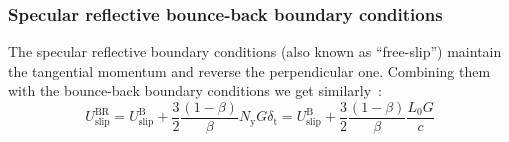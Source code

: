 \subsubsection{Specular reflective bounce-back boundary conditions}
The specular reflective boundary conditions (also known as ``free-slip'') maintain the
tangential momentum and reverse the perpendicular one. Combining them with the bounce-back boundary
conditions we get similarly~\cite{Verhaeghe2009}:
\begin{equation}
 U_\mathrm{slip}^\mathrm{BR} = U_\mathrm{slip}^\mathrm{B} + \frac{3}{2} \frac{(1-\beta)}{\beta} N_\mathrm{y} G \delta_\mathrm{t}
 = U_\mathrm{slip}^\mathrm{B} + \frac{3}{2} \frac{(1-\beta)}{\beta} \frac{L_0 G}{c}
\end{equation}







